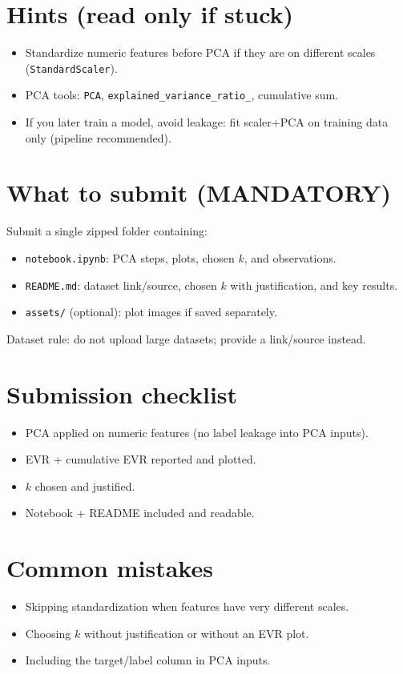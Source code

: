 \documentclass[11pt]{article}
\begin{document}
\section{Hints (read only if stuck)}
\begin{itemize}[leftmargin=*]
  \item Standardize numeric features before PCA if they are on different scales (\texttt{StandardScaler}).
  \item PCA tools: \texttt{PCA}, \texttt{explained\_variance\_ratio\_}, cumulative sum.
  \item If you later train a model, avoid leakage: fit scaler+PCA on training data only (pipeline recommended).
\end{itemize}

\section{What to submit (MANDATORY)}
Submit a single zipped folder containing:
\begin{itemize}[leftmargin=*]
  \item \texttt{notebook.ipynb}: PCA steps, plots, chosen $k$, and observations.
  \item \texttt{README.md}: dataset link/source, chosen $k$ with justification, and key results.
  \item \texttt{assets/} (optional): plot images if saved separately.
\end{itemize}
Dataset rule: do not upload large datasets; provide a link/source instead.

\section{Submission checklist}
\begin{itemize}[leftmargin=*]
  \item PCA applied on numeric features (no label leakage into PCA inputs).
  \item EVR + cumulative EVR reported and plotted.
  \item $k$ chosen and justified.
  \item Notebook + README included and readable.
\end{itemize}

\section{Common mistakes}
\begin{itemize}[leftmargin=*]
  \item Skipping standardization when features have very different scales.
  \item Choosing $k$ without justification or without an EVR plot.
  \item Including the target/label column in PCA inputs.
\end{itemize}

\notesources{\AIMLLabSources}
\end{document}

